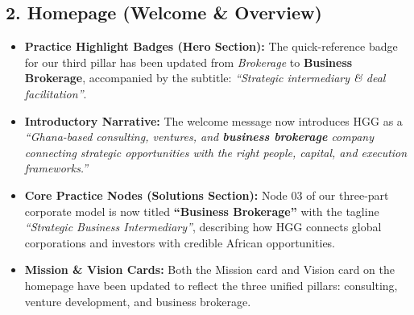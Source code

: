 \documentclass[11pt,a4paper]{article}
\begin{document}
\subsection{2. Homepage (Welcome \& Overview)}
\begin{itemize}[leftmargin=*]
    \item \textbf{Practice Highlight Badges (Hero Section):} The quick-reference badge for our third pillar has been updated from \textit{Brokerage} to \textbf{Business Brokerage}, accompanied by the subtitle: \textit{``Strategic intermediary \& deal facilitation''}.
    \item \textbf{Introductory Narrative:} The welcome message now introduces HGG as a \textit{``Ghana-based consulting, ventures, and \textbf{business brokerage} company connecting strategic opportunities with the right people, capital, and execution frameworks.''}
    \item \textbf{Core Practice Nodes (Solutions Section):} Node 03 of our three-part corporate model is now titled \textbf{``Business Brokerage''} with the tagline \textit{``Strategic Business Intermediary''}, describing how HGG connects global corporations and investors with credible African opportunities.
    \item \textbf{Mission \& Vision Cards:} Both the Mission card and Vision card on the homepage have been updated to reflect the three unified pillars: consulting, venture development, and business brokerage.
\end{itemize}
\end{document}
